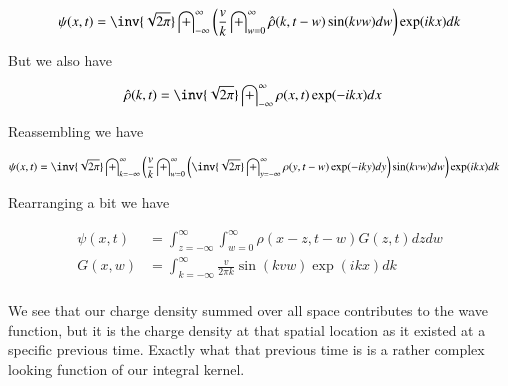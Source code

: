 \documentclass{article}
\newcommand{\IIinf}[0]{ \int_{-\infty}^\infty }
\begin{document}
\begin{align*}
{\psi}(x, t)
&=
\inv{\sqrt{2\pi}} \IIinf
\left(
\frac{v}{k} \int_{w = 0}^\infty \hat{\rho}(k, t-w) \sin( k v w ) dw
\right) \exp( i k x ) dk \\
\end{align*}


But we also have

\begin{align*}
\hat{\rho}(k,t) &= \inv{\sqrt{2\pi}} \int_{-\infty}^\infty {\rho}(x, t) \exp( -i k x ) dx
\end{align*}

Reassembling we have


\begin{align*}
{\psi}(x, t)
&=
\inv{\sqrt{2\pi}}
\int_{k = -\infty}^\infty
\left(
\frac{v}{k}
\int_{w = 0}^\infty
\left(
\inv{\sqrt{2\pi}} \int_{y=-\infty}^\infty {\rho}(y, t-w) \exp( -i k y ) dy
\right)
\sin( k v w ) dw
\right) \exp( i k x ) dk
\end{align*}

Rearranging a bit we have

\begin{align}
{\psi}(x, t)
&=
%
%
\int_{z=-\infty}^\infty
\int_{w = 0}^\infty
{\rho}(x-z, t-w) G(z, t) dz dw \\
G(x, w) &=
\int_{k = -\infty}^\infty
\frac{v}{2\pi k}
\sin( k v w )
\exp( i k x )
dk
\\
\end{align}

We see that our charge density summed over all space contributes to the wave function, but it is the charge density at that spatial location as it existed at a specific previous time.
Exactly what that previous time is is a rather complex looking function of our integral kernel.

\end{document}
